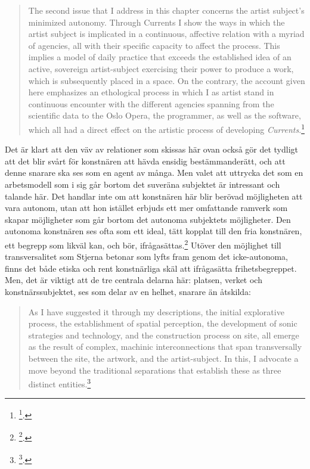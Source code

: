 \documentclass[11pt]{article}
\begin{document}
\begin{quote}
The second issue that I address in this chapter concerns the artist
subject's minimized autonomy. Through Currents I show the ways in
which the artist subject is implicated in a continuous, affective
relation with a myriad of agencies, all with their specific capacity
to affect the process. This implies a model of daily practice that
exceeds the established idea of an active, sovereign artist-subject
exercising their power to produce a work, which is subsequently placed
in a space. On the contrary, the account given here emphasizes an
ethological process in which I as artist stand in continuous encounter
with the different agencies spanning from the scientific data to the
Oslo Opera, the programmer, as well as the software, which all had a
direct effect on the artistic process of developing \emph{Currents}.\footnote{\footcite[s.133]{Stjerna2018}.}
\end{quote}

Det är klart att den väv av relationer som skissas här ovan också gör
det tydligt att det blir svårt för konstnären att hävda ensidig
bestämmanderätt, och att denne snarare ska ses som en agent av många.
Men valet att uttrycka det som en arbetsmodell som i sig går bortom det
suveräna subjektet är intressant och talande här. Det handlar inte om
att konstnären här blir berövad möjligheten att vara autonom, utan att
hon istället erbjuds ett mer omfattande ramverk som skapar möjligheter
som går bortom det autonoma subjektets möjligheter. Den autonoma
konstnären ses ofta som ett ideal, tätt kopplat till den fria
konstnären, ett begrepp som likväl kan, och bör, ifrågasättas.\footnote{\footcite[Se till exempel ][ s.21]{peters09}.}
Utöver den möjlighet till transversalitet som Stjerna betonar som lyfts
fram genom det icke-autonoma, finns det både etiska och rent
konstnärliga skäl att ifrågasätta frihetsbegreppet. Men, det är viktigt
att de tre centrala delarna här: platsen, verket och konstnärssubjektet,
ses som delar av en helhet, snarare än åtskilda:

\begin{quote}
As I have suggested it through my descriptions, the initial
explorative process, the establishment of spatial perception, the
development of sonic strategies and technology, and the construction
process on site, all emerge as the result of complex, machinic
interconnections that span transversally between the site, the
artwork, and the artist-subject. In this, I advocate a move beyond the
traditional separations that establish these as three distinct
entities.\footnote{\footcite[s.92]{Stjerna2018}.}
\end{quote}
\end{document}
